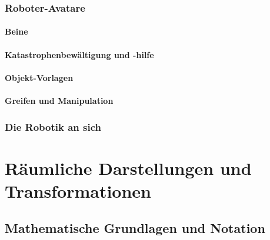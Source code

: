 \documentclass[a4paper, 11pt, accentcolor = tud3b]{tudreport}
\begin{document}
			\subsection{Roboter-Avatare} %

				\subsubsection{Beine} %

				\subsubsection{Katastrophenbewältigung und -hilfe} %

				\subsubsection{Objekt-Vorlagen} %

				\subsubsection{Greifen und Manipulation} %

			\subsection{Die Robotik an sich} %

	\chapter{Räumliche Darstellungen und Transformationen}
		\section{Mathematische Grundlagen und Notation}
\end{document}

